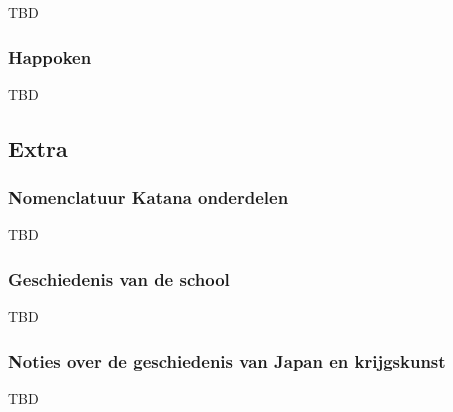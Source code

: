 \suwaristart
TBD

\subsubsection{Happoken}

TBD

\subsection{Extra}

\subsubsection{Nomenclatuur Katana onderdelen}

TBD

\subsubsection{Geschiedenis van de school}

TBD

\subsubsection{Noties over de geschiedenis van Japan en krijgskunst}

TBD
